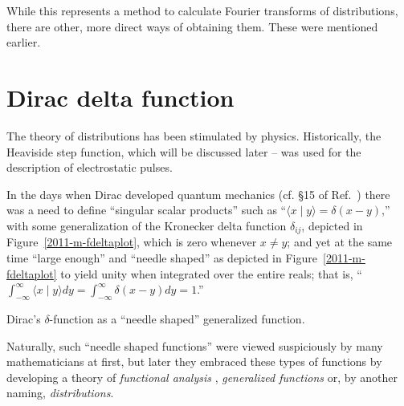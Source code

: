 While this represents a method to calculate  Fourier transforms of distributions, there are other, more direct ways of
obtaining them.
These were mentioned earlier.




\section{Dirac  delta function}



The theory of distributions has been stimulated by physics.
Historically, the Heaviside step function, which will be discussed later --
was used for the description of electrostatic pulses.

In the days when Dirac developed quantum mechanics
(cf. \S 15 of Ref.~\cite[-10mm]{dirac})
there was a need to define
``singular scalar products'' such as ``$\langle x \mid y \rangle = \delta (x-y)$,''
with some generalization of the Kronecker delta function $\delta_{ij}$, depicted in Figure~\ref{2011-m-fdeltaplot},
which is zero whenever $x\neq y$;
and yet at the same time ``large enough'' and
``needle shaped'' as depicted in Figure~\ref{2011-m-fdeltaplot} to yield unity when
integrated over the entire reals; that is, ``$\int_{-\infty}^\infty \langle x \mid y \rangle dy =\int_{-\infty}^\infty \delta (x-y) dy =1$.''
\begin{marginfigure}%
\begin{center}
\end{center}
\caption{Dirac's $\delta$-function as a ``needle shaped'' generalized function.}
  \label{2011-m-fdeltaplot}
\end{marginfigure}


Naturally, such ``needle shaped functions'' were viewed suspiciously by many mathematicians
at first, but later they embraced these types of functions\cite[20mm]{gelfand:1964:gf} by developing a theory of
{\em functional analysis}
,
{\em generalized functions}
or, by another naming,
{\em distributions}.

